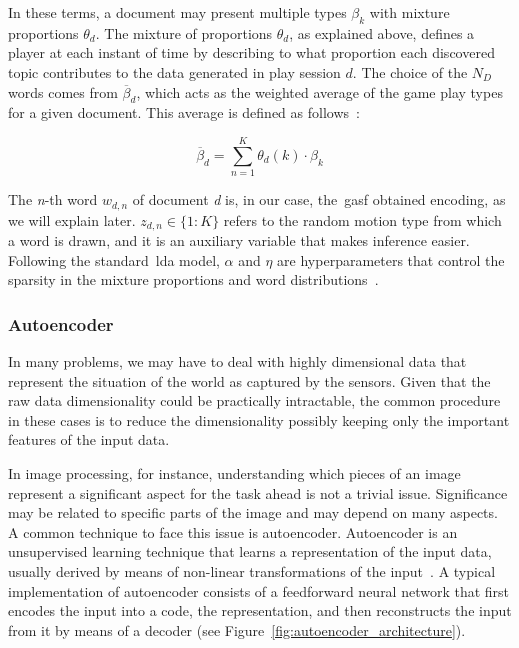 In these terms, a document may present multiple types $\beta_{k}$ with mixture proportions $\theta_{d}$. The mixture of proportions $\theta_{d}$, as explained above, defines a player at each instant of time by describing to what proportion each discovered topic contributes to the data generated in play session $d$. The choice of the $N_{D}$ words comes from $\overline{\beta}_{d}$, which acts as the weighted average of the game play types for a given document. This average is defined as follows~\citep{blei_latent_2003,smith_mining_2016}:

\begin{equation}
\overline{\beta}_{d} = \sum_{n=1}^{K} \theta_{d}(k) \cdot \beta_{k}
\end{equation}

The \textit{n}-th word $w_{d,n}$ of document \textit{d} is, in our case, the~\gls{gasf} obtained encoding, as we will explain later. $z_{d,n} \in \{1:K\}$ refers to the random motion type from which a word is drawn, and it is an auxiliary variable that makes inference easier. Following the standard~\gls{lda} model, $\alpha$ and $\eta$ are hyperparameters that control the sparsity in the mixture proportions and word distributions~\citep{smith_mining_2016}.

\subsubsection{Autoencoder}\label{sec:autoencoder}

In many problems, we may have to deal with highly dimensional data that represent the situation of the world as captured by the sensors. Given that the raw data dimensionality could be practically intractable, the common procedure in these cases is to reduce the dimensionality possibly keeping only the important features of the input data.

In image processing, for instance, understanding which pieces of an image represent a significant aspect for the task ahead is not a trivial issue. Significance may be related to specific parts of the image and may depend on many aspects. A common technique to face this issue is autoencoder.
Autoencoder is an unsupervised learning technique that learns a representation of the input data, usually derived by means of non-linear transformations of the input~\citep{goodfellow_deep_2016}. A typical implementation of autoencoder consists of a feedforward neural network that first encodes the input into a code, the representation, and then reconstructs the input from it by means of a decoder (see Figure~\ref{fig:autoencoder_architecture}).

